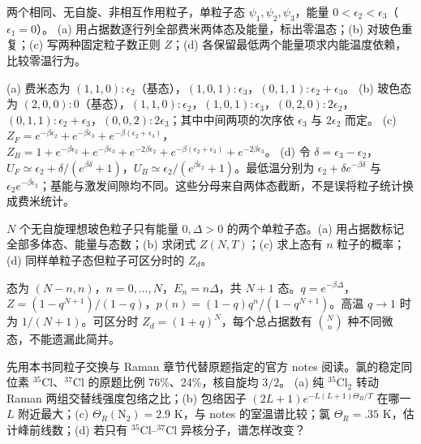 \begin{exercise}
两个相同、无自旋、非相互作用粒子，单粒子态 $\psi_1,\psi_2,\psi_3$，能量 $0<\epsilon_2<\epsilon_3$（$\epsilon_1=0$）。
(a) 用占据数逐行列全部费米两体态及能量，标出零温态；(b) 对玻色重复；(c) 写两种固定粒子数正则 $Z$；(d) 各保留最低两个能量项求内能温度依赖，比较零温行为。
\end{exercise}
\begin{solution}
(a) 费米态为 $(1,1,0):\epsilon_2$（基态），$(1,0,1):\epsilon_3$，$(0,1,1):\epsilon_2+\epsilon_3$。
(b) 玻色态为 $(2,0,0):0$（基态），$(1,1,0):\epsilon_2$，$(1,0,1):\epsilon_3$，$(0,2,0):2\epsilon_2$，$(0,1,1):\epsilon_2+\epsilon_3$，$(0,0,2):2\epsilon_3$；其中中间两项的次序依 $\epsilon_3$ 与 $2\epsilon_2$ 而定。
(c) $Z_F=e^{-\beta\epsilon_2}+e^{-\beta\epsilon_3}+e^{-\beta(\epsilon_2+\epsilon_3)}$，$Z_B=1+e^{-\beta\epsilon_2}+e^{-\beta\epsilon_3}+e^{-2\beta\epsilon_2}+e^{-\beta(\epsilon_2+\epsilon_3)}+e^{-2\beta\epsilon_3}$。
(d) 令 $\delta=\epsilon_3-\epsilon_2$，$U_F\simeq\epsilon_2+\delta/(e^{\beta\delta}+1)$，$U_B\simeq\epsilon_2/(e^{\beta\epsilon_2}+1)$。最低温分别为 $\epsilon_2+\delta e^{-\beta\delta}$ 与 $\epsilon_2e^{-\beta\epsilon_2}$；基能与激发间隙均不同。这些分母来自两体态截断，不是误将粒子统计换成费米统计。
\end{solution}
\begin{exercise}
$N$ 个无自旋理想玻色粒子只有能量 $0,\Delta>0$ 的两个单粒子态。(a) 用占据数标记全部多体态、能量与态数；(b) 求闭式 $Z(N,T)$；(c) 求上态有 $n$ 粒子的概率；(d) 同样单粒子态但粒子可区分时的 $Z_d$。
\end{exercise}
\begin{solution}
态为 $(N-n,n)$，$n=0,\ldots,N$，$E_n=n\Delta$，共 $N+1$ 态。$q=e^{-\beta\Delta}$，$Z=(1-q^{N+1})/(1-q)$，$p(n)=(1-q)q^n/(1-q^{N+1})$。高温 $q\to1$ 时为 $1/(N+1)$。可区分时 $Z_d=(1+q)^N$，每个总占据数有 $\binom Nn$ 种不同微态，不能遗漏此简并。
\end{solution}
\begin{exercise}
先用本书同粒子交换与 Raman 章节代替原题指定的官方 notes 阅读。氯的稳定同位素 $^{35}$Cl、$^{37}$Cl 的原题比例 76\%、24\%，核自旋均 $3/2$。
(a) 纯 $^{35}$Cl$_2$ 转动 Raman 两组交替线强度包络之比；(b) 包络因子 $(2L+1)e^{-L(L+1)\Theta_R/T}$ 在哪一 $L$ 附近最大；(c) $\Theta_R(\mathrm N_2)=2.9$ K，与 notes 的室温谱比较；氯 $\Theta_R=.35$ K，估计峰前线数；(d) 若只有 $^{35}$Cl--$^{37}$Cl 异核分子，谱怎样改变？
\end{exercise}

